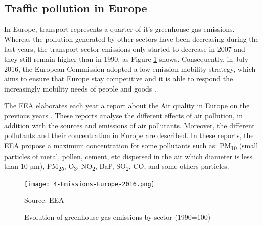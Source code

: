 \subsection{Traffic pollution in Europe}
In Europe, transport represents a quarter of it's greenhouse gas emissions. Whereas the pollution generated by other sectors have been decreasing during the last years, the transport sector emissions only started to decrease in 2007 and they still remain higher than in 1990, as Figure \ref{fig:4-Emissions-Europe-2016} shows. Consequently, in July 2016, the European Commission adopted a low-emission mobility strategy, which aims to ensure that Europe stay competitive and it is able to respond the increasingly mobility needs of people and goods \cite{EuStrat}. 

The \acf{EEA} elaborates each year a report about the Air quality in Europe on the previous years \cite{AirQualityEEA17}. These reports analyse the different effects of air pollution, in addition with the sources and emissions of air pollutants. Moreover, the different pollutants and their concentration in Europe are described. In these reports, the \ac{EEA} propose a maximum concentration for some pollutants such as: PM\textsubscript{10} (small particles of metal, pollen, cement, etc dispersed in the air which diameter is less than 10 µm), PM\textsubscript{25}, O\textsubscript{3}, NO\textsubscript{2}, BaP, SO\textsubscript{2}, CO, and some others particles.

\begin{figure}[!h]
	\begin{center}
		\texttt{[image: 4-Emissions-Europe-2016.png]}	
		\caption{Evolution of greenhouse gas emissions by sector (1990=100)}{Source: \acf{EEA}}
		\label{fig:4-Emissions-Europe-2016}
	\end{center}
\end{figure}


